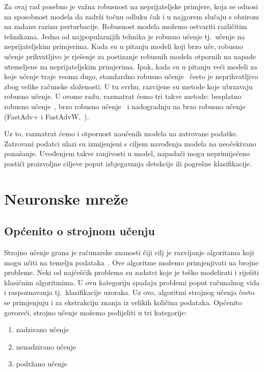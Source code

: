 \documentclass[times, utf8, zavrsni, numeric]{fer}
\begin{document}
Za ovaj rad posebno je važna robusnost na neprijateljske primjere, koja se odnosi na sposobnost modela da zadrži točnu odluku čak i u najgorem slučaju s obzirom na zadanu razinu perturbacije.
Robusnost modela možemo ostvariti različitim tehnikama. Jedna od najpopularnijih tehnika je robusno učenje tj.\ učenje na neprijateljskim primjerima. 
Kada su u pitanju modeli koji brzo uče, robusno učenje prihvatljivo je rješenje za postizanje robusnih modela otpornih na napade utemeljene na neprijateljskim primjerima. 
Ipak, kada su u pitanju veći modeli za koje učenje traje veoma dugo, standardno robusno učenje~\cite{madry2017towards} često je neprihvatljivo zbog velike računske složenosti. 
U tu svrhu, razvijene su metode koje ubrzavaju robusno učenje. U ovome radu, razmatrat ćemo tri takve metode: besplatno robusno učenje~\cite{shafahi2019adversarial}, brzo robusno učenje~\cite{wong2020fast} i
nadogradnju na brzo robusno učenje (FastAdv+ i FastAdvW,~\cite{li2020towards}). 

\pagebreak

Uz to, razmatrat ćemo i otpornost naučenih modela na zatrovane podatke. Zatrovani podatci ulazi su izmijenjeni s ciljem navođenja modela na neočekivano ponašanje. 
Uvođenjem takve ranjivosti u model, napadači mogu neprimijećeno postići proizvoljne ciljeve poput izbjegavanja detekcije ili pogrešne klasifikacije.

\chapter{Neuronske mreže}

\section{Općenito o strojnom učenju}
Strojno učenje grana je računarske znanosti čiji cilj je razvijanje algoritama koji mogu učiti na temelju podataka~\cite{uui2020ml}.
Ove algoritme možemo primjenjivati na brojne probleme. Neki od najčešćih problema su zadatci koje je teško modelirati i riješiti klasičnim algoritmima.
U ovu kategoriju spadaju problemi poput računalnog vida i raspoznavanja tj.\ klasifikacije uzoraka.
Uz ovo, algoritmi strojnog učenja često se primjenjuju i za ekstrakciju znanja iz velikih količina podataka.
Općenito govoreći, strojno učenje možemo podijeliti u tri kategorije:

\begin{enumerate}
    \item nadzirano učenje 
    \item nenadzirano učenje
    \item podržano učenje
\end{enumerate}
\end{document}
